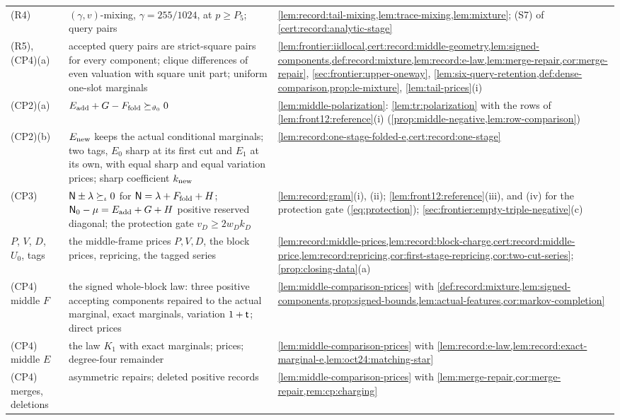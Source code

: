 {\begin{longtable}{@{}>{\raggedright\arraybackslash}p{2.75cm}>{\raggedright\arraybackslash}p{6.1cm}>{\raggedright\arraybackslash}p{5.95cm}@{}}
(R4) & $(\gamma,v)$-mixing, $\gamma=255/1024$, at $p\ge P_5$; query pairs & \cref{lem:record:tail-mixing,lem:trace-mixing,lem:mixture}; (S7) of \cref{cert:record:analytic-stage}\\
(R5), (CP4)(a) & accepted query pairs are strict-square pairs for every component; clique differences of even valuation with square unit part; uniform one-slot marginals & \cref{lem:frontier:iidlocal,cert:record:middle-geometry,lem:signed-components,def:record:mixture,lem:record:e-law,lem:merge-repair,cor:merge-repair}, \cref{sec:frontier:upper-oneway}, \cref{lem:six-query-retention,def:dense-comparison,prop:le-mixture}, \cref{lem:tail-prices}(i)\\
(CP2)(a) & $E_{\rm add}+G-F_{\rm fold}\succeq_{\vartheta_0}0$ & \cref{lem:middle-polarization}: \cref{lem:tr:polarization} with the rows of \cref{lem:front12:reference}(i) (\cref{prop:middle-negative,lem:row-comparison})\\
(CP2)(b) & $E_{\rm new}$ keeps the actual conditional marginals; two tags, $E_0$ sharp at its first cut and $E_1$ at its own, with equal sharp and equal variation prices; sharp coefficient $k_{\rm new}$ & \cref{lem:record:one-stage-folded-e,cert:record:one-stage}\\
(CP3) & $\mathsf N\pm\lambda\succeq_\iota0$ for $\mathsf N=\lambda+F_{\rm fold}+H$; $\mathsf N_0-\mu=E_{\rm add}+G+H$ positive reserved diagonal; the protection gate $v_D\ge2w_Dk_D$ & \cref{lem:record:gram}(i), (ii); \cref{lem:front12:reference}(iii), and (iv) for the protection gate (\cref{eq:protection}); \cref{sec:frontier:empty-triple-negative}(c)\\
$P$, $V$, $D$, $U_0$, tags & the middle-frame prices $P,V,D$, the block prices, repricing, the tagged series & \cref{lem:record:middle-prices,lem:record:block-charge,cert:record:middle-price,lem:record:repricing,cor:first-stage-repricing,cor:two-cut-series}; \cref{prop:closing-data}(a)\\
(CP4) middle $F$ & the signed whole-block law: three positive accepting components repaired to the actual marginal, exact marginals, variation $1+\mathsf t$; direct prices & \cref{lem:middle-comparison-prices} with \cref{def:record:mixture,lem:signed-components,prop:signed-bounds,lem:actual-features,cor:markov-completion}\\
(CP4) middle $E$ & the law $K_1$ with exact marginals; prices; degree-four remainder & \cref{lem:middle-comparison-prices} with \cref{lem:record:e-law,lem:record:exact-marginal-e,lem:oct24:matching-star}\\
(CP4) merges, deletions & asymmetric repairs; deleted positive records & \cref{lem:middle-comparison-prices} with \cref{lem:merge-repair,cor:merge-repair,rem:cp:charging}\\

\end{longtable}}
